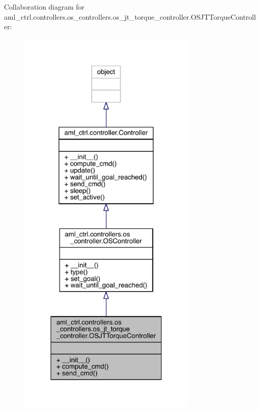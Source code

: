Collaboration diagram for aml\+\_\+ctrl.\+controllers.\+os\+\_\+controllers.\+os\+\_\+jt\+\_\+torque\+\_\+controller.\+O\+S\+J\+T\+Torque\+Controller\+:\nopagebreak
\begin{figure}[H]
\begin{center}
\leavevmode
\includegraphics[width=244pt]{classaml__ctrl_1_1controllers_1_1os__controllers_1_1os__jt__torque__controller_1_1_o_s_j_t_torque_controller__coll__graph}
\end{center}
\end{figure}
